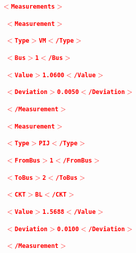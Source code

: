 \documentclass[12pt]{report} %
\begin{document}
\textcolor{red}{\texttt{\textbf{$\boldsymbol{\mathrm{<}}$Measurements$\boldsymbol{\mathrm{>}}$}}}

\textcolor{red}{\texttt{\textbf{  $\boldsymbol{\mathrm{<}}$Measurement$\boldsymbol{\mathrm{>}}$}}}

\textcolor{red}{\texttt{\textbf{    $\boldsymbol{\mathrm{<}}$Type$\boldsymbol{\mathrm{>}}$VM$\boldsymbol{\mathrm{<}}$/Type$\boldsymbol{\mathrm{>}}$}}}

\textcolor{red}{\texttt{\textbf{    $\boldsymbol{\mathrm{<}}$Bus$\boldsymbol{\mathrm{>}}$1$\boldsymbol{\mathrm{<}}$/Bus$\boldsymbol{\mathrm{>}}$}}}

\textcolor{red}{\texttt{\textbf{    $\boldsymbol{\mathrm{<}}$Value$\boldsymbol{\mathrm{>}}$1.0600$\boldsymbol{\mathrm{<}}$/Value$\boldsymbol{\mathrm{>}}$}}}

\textcolor{red}{\texttt{\textbf{    $\boldsymbol{\mathrm{<}}$Deviation$\boldsymbol{\mathrm{>}}$0.0050$\boldsymbol{\mathrm{<}}$/Deviation$\boldsymbol{\mathrm{>}}$}}}

\textcolor{red}{\texttt{\textbf{  $\boldsymbol{\mathrm{<}}$/Measurement$\boldsymbol{\mathrm{>}}$}}}

\textcolor{red}{\texttt{\textbf{  $\boldsymbol{\mathrm{<}}$Measurement$\boldsymbol{\mathrm{>}}$}}}

\textcolor{red}{\texttt{\textbf{    $\boldsymbol{\mathrm{<}}$Type$\boldsymbol{\mathrm{>}}$PIJ$\boldsymbol{\mathrm{<}}$/Type$\boldsymbol{\mathrm{>}}$}}}

\textcolor{red}{\texttt{\textbf{    $\boldsymbol{\mathrm{<}}$FromBus$\boldsymbol{\mathrm{>}}$1$\boldsymbol{\mathrm{<}}$/FromBus$\boldsymbol{\mathrm{>}}$}}}

\textcolor{red}{\texttt{\textbf{    $\boldsymbol{\mathrm{<}}$ToBus$\boldsymbol{\mathrm{>}}$2$\boldsymbol{\mathrm{<}}$/ToBus$\boldsymbol{\mathrm{>}}$}}}

\textcolor{red}{\texttt{\textbf{    $\boldsymbol{\mathrm{<}}$CKT$\boldsymbol{\mathrm{>}}$BL$\boldsymbol{\mathrm{<}}$/CKT$\boldsymbol{\mathrm{>}}$}}}

\textcolor{red}{\texttt{\textbf{    $\boldsymbol{\mathrm{<}}$Value$\boldsymbol{\mathrm{>}}$1.5688$\boldsymbol{\mathrm{<}}$/Value$\boldsymbol{\mathrm{>}}$}}}

\textcolor{red}{\texttt{\textbf{    $\boldsymbol{\mathrm{<}}$Deviation$\boldsymbol{\mathrm{>}}$0.0100$\boldsymbol{\mathrm{<}}$/Deviation$\boldsymbol{\mathrm{>}}$}}}

\textcolor{red}{\texttt{\textbf{  $\boldsymbol{\mathrm{<}}$/Measurement$\boldsymbol{\mathrm{>}}$}}}
\end{document}
